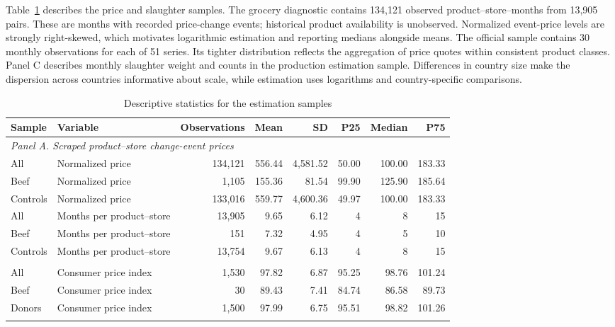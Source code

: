 \documentclass[11pt]{article}
\begin{document}
Table~\ref{tab:descriptives} describes the price and slaughter samples. The grocery diagnostic contains 134,121 observed product--store--months from 13,905 pairs. These are months with recorded price-change events; historical product availability is unobserved. Normalized event-price levels are strongly right-skewed, which motivates logarithmic estimation and reporting medians alongside means. The official sample contains 30 monthly observations for each of 51 series. Its tighter distribution reflects the aggregation of price quotes within consistent product classes. Panel C describes monthly slaughter weight and counts in the production estimation sample. Differences in country size make the dispersion across countries informative about scale, while estimation uses logarithms and country-specific comparisons.

\begin{table}[htbp]
\centering\caption{Descriptive statistics for the estimation samples}\label{tab:descriptives}
\small
\setlength{\tabcolsep}{3pt}
\begin{tabular}{llrrrrrr}\toprule
Sample & Variable & Observations & Mean & SD & P25 & Median & P75 \\\midrule
\multicolumn{8}{l}{\textit{Panel A. Scraped product--store change-event prices}} \\
All & Normalized price & 134,121 & 556.44 & 4,581.52 & 50.00 & 100.00 & 183.33 \\
Beef & Normalized price & 1,105 & 155.36 & 81.54 & 99.90 & 125.90 & 185.64 \\
Controls & Normalized price & 133,016 & 559.77 & 4,600.36 & 49.97 & 100.00 & 183.33 \\
All & Months per product--store & 13,905 & 9.65 & 6.12 & 4 & 8 & 15 \\
Beef & Months per product--store & 151 & 7.32 & 4.95 & 4 & 5 & 10 \\
Controls & Months per product--store & 13,754 & 9.67 & 6.13 & 4 & 8 & 15 \\\addlinespace
\multicolumn{8}{l}{\textit{Panel B. Statistics Denmark consumer price indices}} \\
All & Consumer price index & 1,530 & 97.82 & 6.87 & 95.25 & 98.76 & 101.24 \\
Beef & Consumer price index & 30 & 89.43 & 7.41 & 84.74 & 86.58 & 89.73 \\
Donors & Consumer price index & 1,500 & 97.99 & 6.75 & 95.51 & 98.82 & 101.26 \\\addlinespace
\multicolumn{8}{l}{\textit{Panel C. Eurostat monthly bovine slaughter}} \\

\end{tabular}
\end{table}
\end{document}
